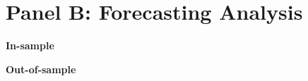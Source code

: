 



















\section{Panel B: Forecasting Analysis}

{\noindent\bfseries In-sample }

{\noindent\bfseries Out-of-sample }
